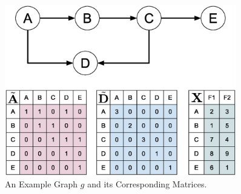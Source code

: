 \begin{figure}[htbp]
    \centerline{\includegraphics[width=0.90\textwidth]{Magic/figures/ExampleGraph.eps}}
    \caption{An Example Graph $g$ and its Corresponding Matrices.}
    \label{MG:Fig:ExampleGraph}
\end{figure}

